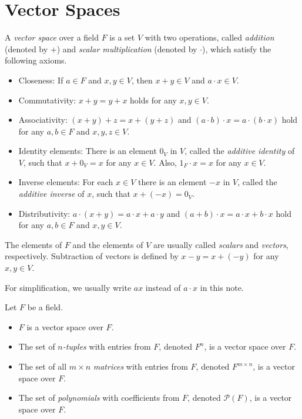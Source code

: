 \section{Vector Spaces}
\begin{definition}
  \label{def:vector-space}
  A \emph{vector space} over a field $F$ is a set $V$ with two operations,
  called \emph{addition} (denoted by $+$) and \emph{scalar multiplication}
  (denoted by $\cdot$), which satisfy the following axioms.
  \begin{itemize}
    \item Closeness: If $a \in F$ and $x, y \in V$, then $x + y \in V$ and
    $a \cdot x \in V$.
    \item Commutativity: $x + y = y + x$ holds for any $x, y \in V$.
    \item Associativity: $(x + y) + z = x + (y + z)$ and
    $(a \cdot b) \cdot x = a \cdot (b \cdot x)$ hold for any
    $a, b \in F$ and $x, y, z \in V$.
    \item Identity elements: There is an element $0_V$ in $V$, called the
    \emph{additive identity} of $V$, such that $x + 0_V = x$ for any $x \in V$.
    Also, $1_F \cdot x = x$ for any $x \in V$.
    \item Inverse elements: For each $x \in V$ there is an element $-x$ in $V$,
    called the \emph{additive inverse} of $x$, such that $x + (-x) = 0_V$.
    \item Distributivity: $a \cdot (x + y) = a \cdot x + a \cdot y$ and
    $(a + b) \cdot x = a \cdot x + b \cdot x$ hold for any $a, b \in F$ and
    $x, y \in V$.
  \end{itemize}
  The elements of $F$ and the elements of $V$ are usually called \emph{scalars}
  and \emph{vectors}, respectively.
  Subtraction of vectors is defined by $x - y = x + (-y)$ for any $x, y \in V$.
\end{definition}
\begin{remark}
  For simplification, we usually write $ax$ instead of $a \cdot x$ in this
  note.
\end{remark}

\begin{examples}
  Let $F$ be a field.
  \begin{itemize}
    \item $F$ is a vector space over $F$.
    \item The set of \emph{$n$-tuples} with entries from $F$, denoted $F^n$,
    is a vector space over $F$.
    \item The set of all $m \times n$ \emph{matrices} with entries from $F$,
    denoted $F^{m \times n}$, is a vector space over $F$.
    \item The set of \emph{polynomials} with coefficients from $F$, denoted
    $\mathcal{P}(F)$, is a vector space over $F$.
  \end{itemize}
\end{examples}

